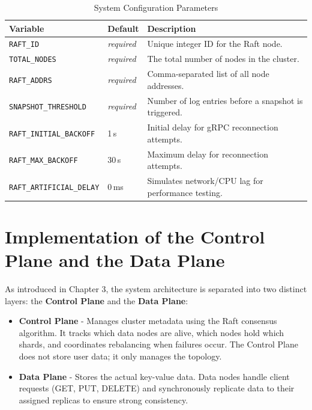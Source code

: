 \documentclass[shortabstract]{iithesis}
\begin{document}
\begin{table}[h!]
\centering
\caption{System Configuration Parameters}
\label{tab:raft_config}
\begin{tabularx}{\textwidth}{|l|l|X|}
\hline
\textbf{Variable} & \textbf{Default} & \textbf{Description} \\ \hline
\texttt{RAFT\_ID} & \textit{required} & Unique integer ID for the Raft node. \\ \hline
\texttt{TOTAL\_NODES} & \textit{required} & The total number of nodes in the cluster. \\ \hline
\texttt{RAFT\_ADDRS} & \textit{required} & Comma-separated list of all node addresses. \\ \hline
\texttt{SNAPSHOT\_THRESHOLD} & \textit{required} & Number of log entries before a snapshot is triggered. \\ \hline
\texttt{RAFT\_INITIAL\_BACKOFF} & 1\,s & Initial delay for gRPC reconnection attempts. \\ \hline
\texttt{RAFT\_MAX\_BACKOFF} & 30\,s & Maximum delay for reconnection attempts. \\ \hline
\texttt{RAFT\_ARTIFICIAL\_DELAY} & 0\,ms & Simulates network/CPU lag for performance testing. \\ \hline
\end{tabularx}
\end{table}




\chapter{Implementation of the Control Plane and the Data Plane}

As introduced in Chapter 3, the system architecture is separated into two distinct layers: the \textbf{Control Plane} and the \textbf{Data Plane}:

\begin{itemize}
    \item \textbf{Control Plane} - Manages cluster metadata using the Raft consensus algorithm. It tracks which data nodes are alive, which nodes hold which shards, and coordinates rebalancing when failures occur. The Control Plane does not store user data; it only manages the topology.
    \item \textbf{Data Plane} - Stores the actual key-value data. Data nodes handle client requests (GET, PUT, DELETE) and synchronously replicate data to their assigned replicas to ensure strong consistency.
\end{itemize}
\end{document}
